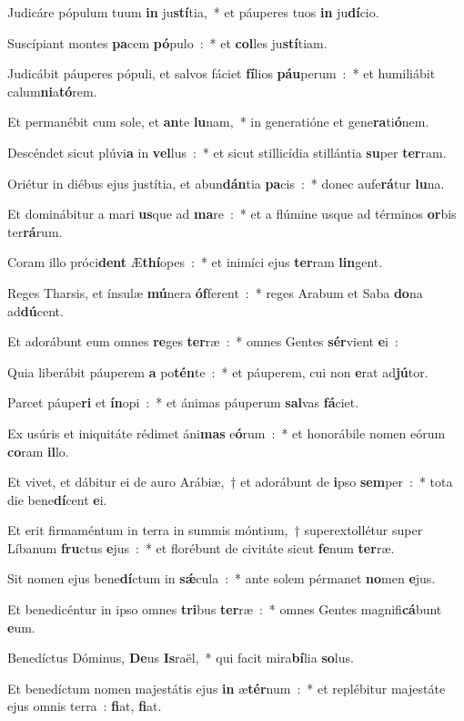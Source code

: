 ﻿\item Judicáre pópulum tuum \textbf{in} ju\textbf{stí}tia,~* et páuperes tuos \textbf{in} ju\textbf{dí}cio.
\item Suscípiant montes \textbf{pa}cem \textbf{pó}pulo~:~* et \textbf{col}les ju\textbf{stí}tiam.
\item Judicábit páuperes pópuli, et salvos fáciet \textbf{fí}lios \textbf{páu}perum~:~* et humiliábit calum\textbf{ni}a\textbf{tó}rem.
\item Et permanébit cum sole, et \textbf{an}te \textbf{lu}nam,~* in generatióne et gene\textbf{ra}ti\textbf{ó}nem.
\item Descéndet sicut plúvi\textbf{a} in \textbf{vel}lus~:~* et sicut stillicídia stillántia \textbf{su}per \textbf{ter}ram.
\item Oriétur in diébus ejus justítia, et abun\textbf{dán}tia \textbf{pa}cis~:~* donec aufe\textbf{rá}tur \textbf{lu}na.
\item Et dominábitur a mari \textbf{us}que ad \textbf{ma}re~:~* et a flúmine usque ad términos \textbf{or}bis ter\textbf{rá}rum.
\item Coram illo próci\textbf{dent} Æ\textbf{thí}opes~:~* et inimíci ejus \textbf{ter}ram \textbf{lin}gent.
\item Reges Tharsis, et ínsulæ \textbf{mú}nera \textbf{óf}ferent~:~* reges Arabum et Saba \textbf{do}na ad\textbf{dú}cent.
\item Et adorábunt eum omnes \textbf{re}ges \textbf{ter}ræ~:~* omnes Gentes \textbf{sér}vient \textbf{e}i~:
\item Quia liberábit páuperem \textbf{a} po\textbf{tén}te~:~* et páuperem, cui non \textbf{e}rat ad\textbf{jú}tor.
\item Parcet páupe\textbf{ri} et \textbf{ín}opi~:~* et ánimas páuperum \textbf{sal}vas \textbf{fá}ciet.
\item Ex usúris et iniquitáte rédimet áni\textbf{mas} e\textbf{ó}rum~:~* et honorábile nomen eórum \textbf{co}ram \textbf{il}lo.
\item Et vivet, et dábitur ei de auro Arábiæ,~† et adorábunt de \textbf{i}pso \textbf{sem}per~:~* tota die bene\textbf{dí}cent \textbf{e}i.
\item Et erit firmaméntum in terra in summis móntium,~† superextollétur super Líbanum \textbf{fru}ctus \textbf{e}jus~:~* et florébunt de civitáte sicut \textbf{fe}num \textbf{ter}ræ.\ifx\lalinebreakaftersixteen\undefined\else\\\fi
\item Sit nomen ejus bene\textbf{dí}ctum in \textbf{sǽ}cula~:~* ante solem pérmanet \textbf{no}men \textbf{e}jus.
\item Et benedicéntur in ipso omnes \textbf{tri}bus \textbf{ter}ræ~:~* omnes Gentes magnifi\textbf{cá}bunt \textbf{e}um.
\item Benedíctus Dóminus, \textbf{De}us \textbf{Is}raël,~* qui facit mira\textbf{bí}lia \textbf{so}lus.
\item Et benedíctum nomen majestátis ejus \textbf{in} æ\textbf{tér}num~:~* et replébitur majestáte ejus omnis terra~: \textbf{fi}at, \textbf{fi}at.